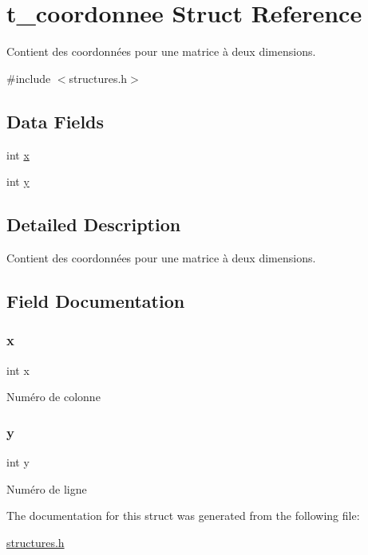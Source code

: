 \hypertarget{structt__coordonnee}{}\section{t\+\_\+coordonnee Struct Reference}
\label{structt__coordonnee}


Contient des coordonnées pour une matrice à deux dimensions.  




{\ttfamily \#include $<$structures.\+h$>$}

\subsection*{Data Fields}
\begin{DoxyCompactItemize}
\item 
int \mbox{\hyperlink{structt__coordonnee_a6150e0515f7202e2fb518f7206ed97dc}{x}}
\item 
int \mbox{\hyperlink{structt__coordonnee_a0a2f84ed7838f07779ae24c5a9086d33}{y}}
\end{DoxyCompactItemize}


\subsection{Detailed Description}
Contient des coordonnées pour une matrice à deux dimensions. 

\subsection{Field Documentation}
\mbox{\label{structt__coordonnee_a6150e0515f7202e2fb518f7206ed97dc}} 
\subsubsection{\texorpdfstring{x}{x}}
{\footnotesize\ttfamily int x}

Numéro de colonne \mbox{\label{structt__coordonnee_a0a2f84ed7838f07779ae24c5a9086d33}} 
\subsubsection{\texorpdfstring{y}{y}}
{\footnotesize\ttfamily int y}

Numéro de ligne 

The documentation for this struct was generated from the following file\+:\begin{DoxyCompactItemize}
\item 
\mbox{\hyperlink{structures_8h}{structures.\+h}}\end{DoxyCompactItemize}
